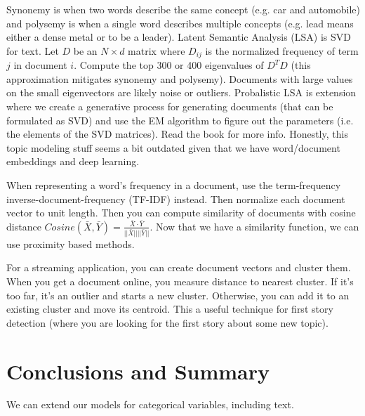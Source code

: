 \documentclass[a4paper]{article}
\begin{document}
Synonemy is when two words describe the same concept (e.g. car and automobile)
and polysemy is when a single word describes multiple concepts (e.g. lead
means either a dense metal or to be a leader). Latent Semantic Analysis (LSA)
is SVD for text. Let $D$ be an $N \times d$ matrix where $D_{ij}$ is the
normalized frequency of term $j$ in document $i$. Compute the top 300 or 400
eigenvalues of $D^T D$ (this approximation mitigates synonemy and polysemy).
Documents with large values on the small eigenvectors are likely noise or
outliers. Probalistic LSA is extension where we create a generative process
for generating documents (that can be formulated as SVD)
and use the EM algorithm to figure out the parameters (i.e. the elements
of the SVD matrices). Read the book for more info. Honestly, this topic modeling
stuff seems a bit outdated given that we have word/document embeddings and
deep learning.

When representing a word's frequency in a document, use the term-frequency
inverse-document-frequency (TF-IDF) instead. Then normalize each document
vector to unit length. Then you can compute similarity of documents with
cosine distance $Cosine(\bar{X}, \bar{Y}) = \frac{\bar{X} \cdot \bar{Y}}{
||\bar{X}|| ||\bar{Y}||}$. Now that we have a similarity function, we can use
proximity based methods.

For a streaming application, you can create document vectors and cluster them.
When you get a document online, you measure distance to nearest cluster. If
it's too far, it's an outlier and starts a new cluster. Otherwise, you can add
it to an existing cluster and move its centroid. This a useful technique for
first story detection (where you are looking for the first story about some
new topic).

\section{Conclusions and Summary}
We can extend our models for categorical variables, including text.
\end{document}
